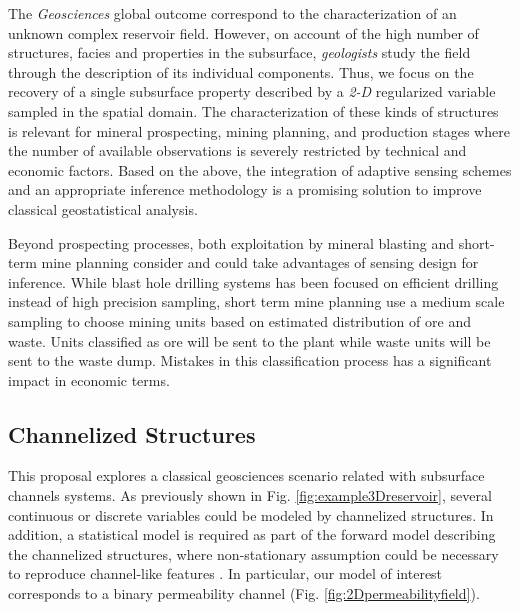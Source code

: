The \emph{Geosciences} global outcome correspond to the characterization of an unknown complex reservoir field. However, on account of the high number of structures, facies and properties in the subsurface, \emph{geologists} study the field through the description of its individual components. Thus, we focus on the recovery of a single subsurface property described by a \emph{2-D} regularized variable sampled in the spatial domain. The characterization of these kinds of structures is relevant for mineral prospecting, mining planning, and production stages where the number of available observations is severely restricted by technical and economic factors. Based on the above, the integration of adaptive sensing schemes and an appropriate inference methodology is a promising solution to improve classical geostatistical analysis.

Beyond prospecting processes, both exploitation by mineral blasting and short-term mine planning consider and could take advantages of sensing design for inference. While blast hole drilling systems has been focused on efficient drilling instead of high precision sampling, short term mine planning use a medium scale sampling to choose mining units based on estimated distribution of ore and waste. Units classified as ore will be sent to the plant while waste units will be sent to the waste dump. Mistakes in this classification process has a significant impact in economic terms.




\subsection{Channelized Structures}

This proposal explores a classical geosciences scenario related with subsurface channels systems. As previously shown in Fig. \ref{fig:example3Dreservoir}, several continuous or discrete variables could be modeled by channelized structures. In addition, a statistical model is required as part of the forward model describing the channelized structures, where non-stationary assumption could be necessary to reproduce channel-like features \cite{Oliver_2008_a,Remy_2009_a}. In particular, our model of interest corresponds to a binary permeability channel (Fig. \ref{fig:2Dpermeabilityfield}). %

